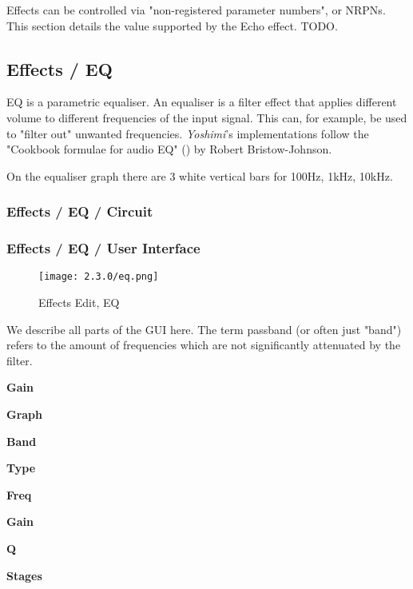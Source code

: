    Effects can be controlled via "non-registered parameter numbers", or NRPNs.
   This section details the value supported by the Echo effect.  TODO.

\subsection{Effects / EQ}
\label{subsec:effects_edit_eq}

   EQ is a parametric equaliser.
   An equaliser is a filter effect that applies different volume to different
   frequencies of the input signal. This can, for example, be used to "filter
   out" unwanted frequencies. \textsl{Yoshimi}’s implementations follow the
   "Cookbook formulae for audio EQ" (\cite{cookbookeq})
   by Robert Bristow-Johnson.

   On the equaliser graph there are 3 white
   vertical bars for 100Hz, 1kHz, 10kHz.

\subsubsection{Effects / EQ / Circuit}
\label{subsubsec:effects_edit_eq_circuit}

\iffalse
 No such figure:

 \begin{figure}[H]
    \centering
    \texttt{[image: zyn/effects/eq.png]}
    \caption{EQ Circuit Diagram}
    \label{fig:eq_circuit_diagram}
 \end{figure}
\fi

\subsubsection{Effects / EQ / User Interface}
\label{subsubsec:effects_edit_eq_ui}

\begin{figure}[H]
   \centering
   \texttt{[image: 2.3.0/eq.png]}
   \caption{Effects Edit, EQ}
   \label{fig:effects_edit_eq}
\end{figure}

   We describe all parts of the GUI here. The term passband (or often just
   "band") refers to the amount of frequencies which are not
   significantly attenuated by the filter.

   \begin{enumber}
      \item \textbf{Gain}
      \item \textbf{Graph}
      \item \textbf{Band}
      \item \textbf{Type}
      \item \textbf{Freq}
      \item \textbf{Gain}
      \item \textbf{Q}
      \item \textbf{Stages}
   \end{enumber}

